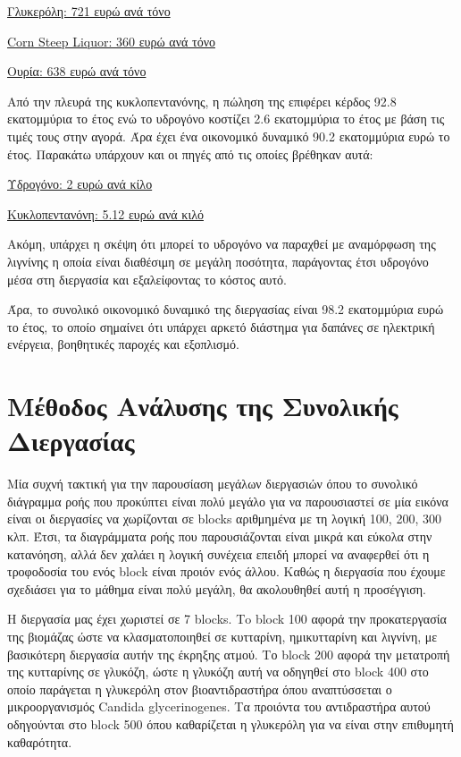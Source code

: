\documentclass[11pt]{article}
\begin{document}
\href{https://www.selinawamucii.com/insights/prices/united-states-of-america/glycerol/}{Γλυκερόλη: 721 ευρώ ανά τόνο}

\href{https://www.indiamart.com/proddetail/corn-steep-liquor-15744963191.html}{Corn Steep Liquor: 360 ευρώ ανά τόνο}

\href{https://tradingeconomics.com/commodity/urea}{Ουρία: 638 ευρώ ανά τόνο}

Από την πλευρά της κυκλοπεντανόνης, η πώληση της επιφέρει κέρδος 92.8 εκατομμύρια το έτος ενώ το υδρογόνο κοστίζει 2.6 εκατομμύρια το έτος με βάση τις τιμές τους στην αγορά. Άρα έχει ένα οικονομικό δυναμικό 90.2 εκατομμύρια ευρώ το έτος. Παρακάτω υπάρχουν και οι πηγές από τις οποίες βρέθηκαν αυτά:

\href{https://www.sgh2energy.com/economics}{Υδρογόνο: 2 ευρώ ανά κίλο}

\href{https://dir.indiamart.com/impcat/cyclopentanone.html}{Κυκλοπεντανόνη: 5.12 ευρώ ανά κιλό}

Ακόμη, υπάρχει η σκέψη ότι μπορεί το υδρογόνο να παραχθεί με αναμόρφωση της λιγνίνης η οποία είναι διαθέσιμη σε μεγάλη ποσότητα, παράγοντας έτσι υδρογόνο μέσα στη διεργασία και εξαλείφοντας το κόστος αυτό. 

Άρα, το συνολικό οικονομικό δυναμικό της διεργασίας είναι 98.2 εκατομμύρια ευρώ το έτος, το οποίο σημαίνει ότι υπάρχει αρκετό διάστημα για δαπάνες σε ηλεκτρική ενέργεια, βοηθητικές παροχές και εξοπλισμό.

\section{Μέθοδος Ανάλυσης της Συνολικής Διεργασίας}
\label{sec:org2c930a4}
Μία συχνή τακτική για την παρουσίαση μεγάλων διεργασιών όπου το συνολικό διάγραμμα ροής που προκύπτει είναι πολύ μεγάλο για να παρουσιαστεί σε μία εικόνα είναι οι διεργασίες να χωρίζονται σε blocks αριθμημένα με τη λογική 100, 200, 300 κλπ. Έτσι, τα διαγράμματα ροής που παρουσιάζονται είναι μικρά και εύκολα στην κατανόηση, αλλά δεν χαλάει η λογική συνέχεια επειδή μπορεί να αναφερθεί ότι η τροφοδοσία του ενός block είναι προιόν ενός άλλου. Καθώς η διεργασία που έχουμε σχεδιάσει για το μάθημα είναι πολύ μεγάλη, θα ακολουθηθεί αυτή η προσέγγιση.

Η διεργασία μας έχει χωριστεί σε 7 blocks. Τo block 100 αφορά την προκατεργασία της βιομάζας ώστε να κλασματοποιηθεί σε κυτταρίνη, ημικυτταρίνη και λιγνίνη, με βασικότερη διεργασία αυτήν της έκρηξης ατμού. Το block 200 αφορά την μετατροπή της κυτταρίνης σε γλυκόζη, ώστε η γλυκόζη αυτή να οδηγηθεί στο block 400 στο οποίο παράγεται η γλυκερόλη στον βιοαντιδραστήρα όπου αναπτύσσεται ο μικροοργανισμός Candida glycerinogenes. Tα προιόντα του αντιδραστήρα αυτού οδηγούνται στο block 500 όπου καθαρίζεται η γλυκερόλη για να είναι στην επιθυμητή καθαρότητα.
\end{document}
